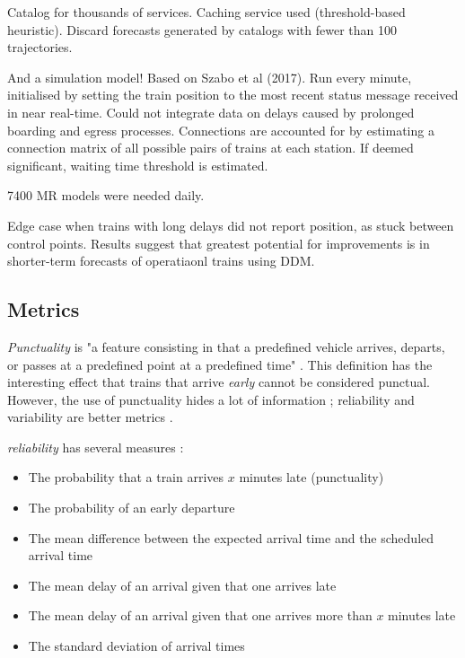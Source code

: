 \documentclass{article}
\begin{document}
Catalog for thousands of services. Caching service used (threshold-based heuristic). Discard forecasts generated by catalogs with fewer than 100 trajectories.

And a simulation model! Based on Szabo et al (2017). Run every minute, initialised by setting the train position to the most recent status message received in near real-time. Could not integrate data on delays caused by prolonged boarding and egress processes. Connections are accounted for by estimating a connection matrix of all possible pairs of trains at each station. If deemed significant, waiting time threshold is estimated. 

7400 MR models were needed daily. 

Edge case when trains with long delays did not report position, as stuck between control points. Results suggest that greatest potential for improvements is in shorter-term forecasts of operatiaonl trains using DDM. 

\subsection{Metrics}

\textit{Punctuality} is "a feature consisting in that a predefined vehicle arrives, departs, or passes at a predefined point at a predefined time" \cite{rudnicki_1997}. This definition has the interesting effect that trains 
that arrive \textit{early} cannot be considered punctual. However, the use of punctuality hides a lot of information \cite{skagestad_2004}; reliability and variability are better metrics \cite{olsson_haugland_2004}.

\textit{reliability} has several measures \cite{rietveld_bruinsma_van_vuuren_2001}:

\begin{itemize}
	\item The probability that a train arrives $x$ minutes late (punctuality)
	\item The probability of an early departure
	\item The mean difference between the expected arrival time and the scheduled arrival time
	\item The mean delay of an arrival given that one arrives late
	\item The mean delay of an arrival given that one arrives more than $x$ minutes late
	\item The standard deviation of arrival times
\end{itemize}
\end{document}
